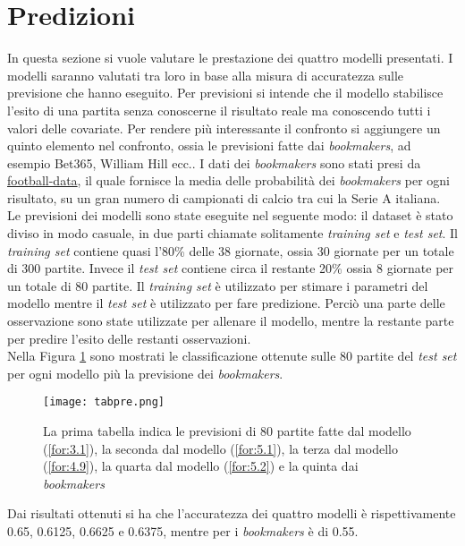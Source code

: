 \section{Predizioni}
In questa sezione si vuole valutare le prestazione dei quattro modelli presentati. I modelli saranno valutati tra loro in base alla misura di accuratezza sulle previsione che hanno eseguito. Per previsioni si intende che il modello stabilisce l'esito di una partita senza conoscerne il risultato reale ma conoscendo tutti i valori delle covariate. Per rendere più interessante il confronto si aggiungere un quinto elemento nel confronto, ossia le previsioni fatte dai \emph{bookmakers}, ad esempio Bet365, William Hill ecc.. I dati dei \emph{bookmakers} sono stati presi da \href{https://www.football-data.co.uk/}{football-data}, il quale fornisce la media delle probabilità dei \emph{bookmakers} per ogni risultato, su un gran numero di campionati di calcio tra cui la Serie A italiana.\\
Le previsioni dei modelli sono state eseguite nel seguente modo: il dataset è stato diviso in modo casuale, in due parti chiamate solitamente \emph{training set} e \emph{test set}. Il \emph{training set} contiene quasi l'80\% delle 38 giornate, ossia 30 giornate per un totale di 300 partite. Invece il \emph{test set} contiene circa il restante 20\% ossia 8 giornate per un totale di 80 partite. Il \emph{training set} è utilizzato per stimare i parametri del modello mentre il \emph{test set} è utilizzato per fare predizione. Perciò una parte delle osservazione sono state utilizzate per allenare il modello, mentre la restante parte per predire l'esito delle restanti osservazioni. \\
Nella Figura \ref{fig:pre} sono mostrati le classificazione ottenute sulle 80 partite del \emph{test set} per ogni modello più la previsione dei \emph{bookmakers}.
\begin{figure}[htbp]
	\begin{center}
		\texttt{[image: tabpre.png]}
		\caption{La prima tabella indica le previsioni di 80 partite fatte dal modello (\ref{for:3.1}), la seconda dal modello (\ref{for:5.1}), la terza dal modello (\ref{for:4.9}), la quarta dal modello (\ref{for:5.2}) e la quinta dai \emph{bookmakers}
			\label{fig:pre}}
	\end{center}
\end{figure}

Dai risultati ottenuti si ha che l'accuratezza dei quattro modelli è rispettivamente 0.65, 0.6125, 0.6625 e 0.6375, mentre per i \emph{bookmakers} è di 0.55.

